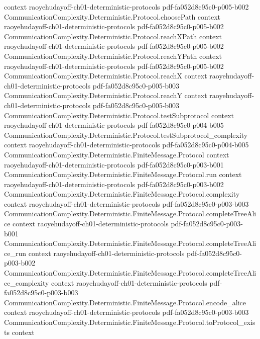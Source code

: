 \begin{theorem}
  {context}
  {raoyehudayoff-ch01-deterministic-protocols}
  {pdf-fa052d8c95c0-p005-b002}
\proofstep
  {CommunicationComplexity.Deterministic.Protocol.choosePath}
  {context}
  {raoyehudayoff-ch01-deterministic-protocols}
  {pdf-fa052d8c95c0-p005-b002}
\proofstep
  {CommunicationComplexity.Deterministic.Protocol.reachXPath}
  {context}
  {raoyehudayoff-ch01-deterministic-protocols}
  {pdf-fa052d8c95c0-p005-b002}
\proofstep
  {CommunicationComplexity.Deterministic.Protocol.reachYPath}
  {context}
  {raoyehudayoff-ch01-deterministic-protocols}
  {pdf-fa052d8c95c0-p005-b002}
\proofstep
  {CommunicationComplexity.Deterministic.Protocol.reachX}
  {context}
  {raoyehudayoff-ch01-deterministic-protocols}
  {pdf-fa052d8c95c0-p005-b003}
\proofstep
  {CommunicationComplexity.Deterministic.Protocol.reachY}
  {context}
  {raoyehudayoff-ch01-deterministic-protocols}
  {pdf-fa052d8c95c0-p005-b003}
\proofstep
  {CommunicationComplexity.Deterministic.Protocol.testSubprotocol}
  {context}
  {raoyehudayoff-ch01-deterministic-protocols}
  {pdf-fa052d8c95c0-p004-b005}
\proofstep
  {CommunicationComplexity.Deterministic.Protocol.testSubprotocol_complexity}
  {context}
  {raoyehudayoff-ch01-deterministic-protocols}
  {pdf-fa052d8c95c0-p004-b005}
\proofstep
  {CommunicationComplexity.Deterministic.FiniteMessage.Protocol}
  {context}
  {raoyehudayoff-ch01-deterministic-protocols}
  {pdf-fa052d8c95c0-p003-b001}
\proofstep
  {CommunicationComplexity.Deterministic.FiniteMessage.Protocol.run}
  {context}
  {raoyehudayoff-ch01-deterministic-protocols}
  {pdf-fa052d8c95c0-p003-b002}
\proofstep
  {CommunicationComplexity.Deterministic.FiniteMessage.Protocol.complexity}
  {context}
  {raoyehudayoff-ch01-deterministic-protocols}
  {pdf-fa052d8c95c0-p003-b003}
\proofstep
  {CommunicationComplexity.Deterministic.FiniteMessage.Protocol.completeTreeAlice}
  {context}
  {raoyehudayoff-ch01-deterministic-protocols}
  {pdf-fa052d8c95c0-p003-b001}
\proofstep
  {CommunicationComplexity.Deterministic.FiniteMessage.Protocol.completeTreeAlice_run}
  {context}
  {raoyehudayoff-ch01-deterministic-protocols}
  {pdf-fa052d8c95c0-p003-b002}
\proofstep
  {CommunicationComplexity.Deterministic.FiniteMessage.Protocol.completeTreeAlice_complexity}
  {context}
  {raoyehudayoff-ch01-deterministic-protocols}
  {pdf-fa052d8c95c0-p003-b003}
\proofstep
  {CommunicationComplexity.Deterministic.FiniteMessage.Protocol.encode_alice}
  {context}
  {raoyehudayoff-ch01-deterministic-protocols}
  {pdf-fa052d8c95c0-p003-b003}
\proofstep
  {CommunicationComplexity.Deterministic.FiniteMessage.Protocol.toProtocol_exists}
  {context}

\end{theorem}
